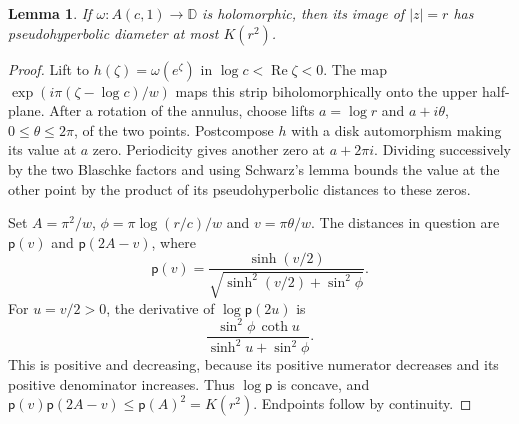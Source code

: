 \documentclass[11pt]{article}
\newtheorem{lemma}{Lemma}
\newcommand{\D}{\mathbb D}
\newcommand{\ph}{\mathsf p}
\begin{document}
\begin{lemma}\label{lem:diam}
If $\omega:A(c,1)\to\D$ is holomorphic, then its image of $|z|=r$
has pseudohyperbolic diameter at most $K(r^2)$.
\end{lemma}
\begin{proof}
Lift to $h(\zeta)=\omega(e^\zeta)$ in $\log c<\operatorname{Re}\zeta<0$.
The map $\exp(i\pi(\zeta-\log c)/w)$ maps this strip biholomorphically
onto the upper half-plane. After a rotation of the annulus, choose lifts
$a=\log r$ and $a+i\theta$, $0\le\theta\le2\pi$, of the two points.
Postcompose $h$ with a disk automorphism making its value at $a$ zero.
Periodicity gives another zero at $a+2\pi i$. Dividing successively by
the two Blaschke factors and using Schwarz's lemma bounds the value at the
other point by the product of its pseudohyperbolic distances to these zeros.

Set $A=\pi^2/w$, $\phi=\pi\log(r/c)/w$ and $v=\pi\theta/w$.
The distances in question are $\ph(v)$ and $\ph(2A-v)$, where
\[
 \ph(v)=\frac{\sinh(v/2)}{\sqrt{\sinh^2(v/2)+\sin^2\phi}}.
\]
For $u=v/2>0$, the derivative of $\log\ph(2u)$ is
\[
 \frac{\sin^2\phi\,\coth u}{\sinh^2u+\sin^2\phi}.
\]
This is positive and decreasing, because its positive numerator decreases
and its positive denominator increases. Thus $\log\ph$ is concave, and
$\ph(v)\ph(2A-v)\le\ph(A)^2=K(r^2)$. Endpoints follow by continuity.
\end{proof}
\end{document}
